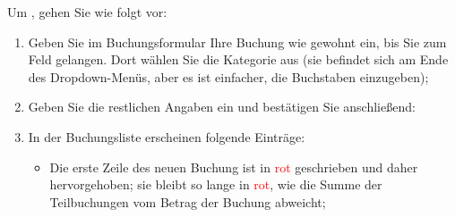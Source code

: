 Um , gehen Sie wie folgt vor:

\begin{enumerate}
	\item Geben Sie im Buchungsformular Ihre Buchung wie gewohnt ein, bis Sie zum Feld  gelangen. Dort wählen Sie die Kategorie  aus (sie befindet sich am Ende des Dropdown-Menüs, aber es ist einfacher, die Buchstaben  einzugeben);
	\item Geben Sie die restlichen Angaben ein und bestätigen Sie anschließend:
	\item In der Buchungsliste erscheinen folgende Einträge:
	\begin{itemize}
		\item Die erste Zeile des neuen Buchung ist in \textcolor{red}{\textsf{rot}} geschrieben und daher hervorgehoben; sie bleibt so lange in \textcolor{red}{\textsf{rot}}, wie die Summe der Teilbuchungen vom Betrag der Buchung abweicht;

\end{itemize}
\end{enumerate}
